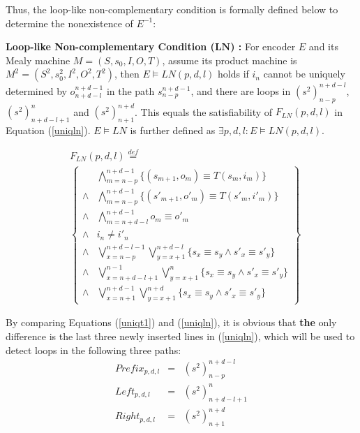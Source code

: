 \documentclass[journal]{IEEEtran}
\begin{document}
Thus,
the loop-like non-complementary condition is formally defined below to determine the nonexistence of $E^{-1}$:

\begin{definition11}\label{def_lnc}%
\textbf{Loop-like Non-complementary Condition ($\boldsymbol{LN}$) :}
For encoder $E$ and its Mealy machine $M=(S,s_0,I,O,T)$,
assume its product machine is $M^2=(S^2,s_0^2,I^2,O^2,T^2)$,
then $E\vDash LN(p,d,l)$ holds if
$i_n$ cannot be uniquely determined by $o_{n+d-l}^{n+d-1}$ in the path $s_{n-p}^{n+d-1}$,
and there are loops in $(s^2)_{n-p}^{n+d-l}$,$(s^2)_{n+d-l+1}^n$ and $(s^2)_{n+1}^{n+d}$.
This equals the satisfiability of $F_{LN}(p,d,l)$ in Equation (\ref{uniqln}).
$E\vDash LN$ is further defined as $\exists p,d,l:E\vDash LN(p,d,l)$.
\end{definition11}


\begin{equation}\label{uniqln}
\begin{split}
&F_{LN}(p,d,l)\overset{def}{=}\\
&\left\{
\begin{array}{cc}
&\bigwedge_{m=n-p}^{n+d-1}
\{
(s_{m+1},o_m)\equiv T(s_m,i_m)
\}
\\
\wedge&\bigwedge_{m=n-p}^{n+d-1}
\{
(s'_{m+1},o'_m)\equiv T(s'_m,i'_m)
\}
\\
\wedge&\bigwedge_{m=n+d-l}^{n+d-1}o_m\equiv o'_m \\
\wedge& i_n\ne i'_n \\
\wedge&\bigvee_{x=n-p}^{n+d-l-1}\bigvee_{y=x+1}^{n+d-l} \{s_x\equiv s_y\wedge s'_x\equiv s'_y\} \\
\wedge&\bigvee_{x=n+d-l+1}^{n-1}\bigvee_{y=x+1}^{n} \{s_x\equiv s_y\wedge s'_x\equiv s'_y\} \\
\wedge&\bigvee_{x=n+1}^{n+d-1}\bigvee_{y=x+1}^{n+d} \{s_x\equiv s_y\wedge s'_x\equiv s'_y\}
\end{array}
\right\}
\end{split}
\end{equation}

By comparing Equations (\ref{uniqt1}) and (\ref{uniqln}),
it is obvious that \textbf{the} only difference is the last three newly inserted lines in (\ref{uniqln}),
which will be used to detect loops in the following three paths:
\begin{equation}
\begin{array}{ccc}
Prefix_{p,d,l}&=&(s^2)_{n-p}^{n+d-l} \\
Left_{p,d,l}&=&(s^2)_{n+d-l+1}^n \\
Right_{p,d,l}&=&(s^2)_{n+1}^{n+d}
\end{array}
\end{equation}
\end{document}
